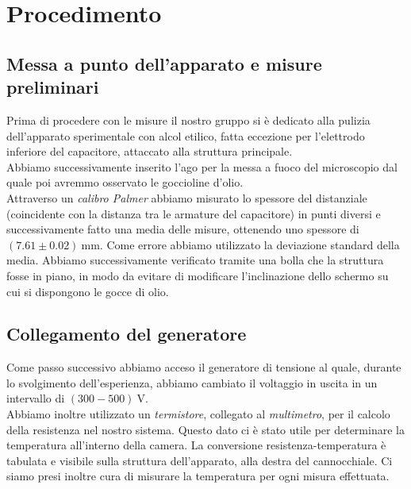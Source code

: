 \section{Procedimento}    
    \subsection{Messa a punto dell'apparato e misure preliminari}
        Prima di procedere con le misure il nostro gruppo si è dedicato alla pulizia dell'apparato sperimentale con alcol etilico, fatta eccezione per l'elettrodo inferiore del capacitore, attaccato alla struttura principale.\\
        Abbiamo successivamente inserito l'ago per la messa a fuoco del microscopio dal quale poi avremmo osservato le goccioline d'olio.\\
        Attraverso un \textit{calibro Palmer} abbiamo misurato lo spessore del distanziale (coincidente con la distanza tra le armature del capacitore) in punti diversi e successivamente fatto una media delle misure, ottenendo uno spessore di 
            $(7.61\pm0.02)~\mathrm{mm}$.
        Come errore abbiamo utilizzato la deviazione standard della media.
        Abbiamo successivamente verificato tramite una bolla che la struttura fosse in piano, in modo da evitare di modificare l'inclinazione dello schermo su cui si dispongono le gocce di olio.

        
    
    \subsection{Collegamento del generatore}
        Come passo successivo abbiamo acceso il generatore di tensione al quale, durante lo svolgimento dell'esperienza, abbiamo cambiato il voltaggio in uscita in un intervallo di
            $(300-500)~\mathrm{V}$.\\
        Abbiamo inoltre utilizzato un \textit{termistore}, collegato al \textit{multimetro}, per il calcolo della resistenza nel nostro sistema. Questo dato ci è stato utile per determinare la temperatura all'interno della camera. La conversione resistenza-temperatura è tabulata e visibile sulla struttura dell'apparato, alla destra del cannocchiale.
        Ci siamo presi inoltre cura di misurare la temperatura per ogni
        misura effettuata.
